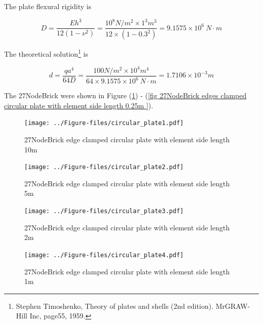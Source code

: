 \documentclass[fleqn,11pt]{article}
\begin{document}
The plate flexural rigidity is 

\begin{equation}
  D=\frac{Eh^3}{12(1-\nu^2)}=\frac{10^8 N/m^2 \times 1^3 m^3 }{12 \times (1-0.3^2) }= 9.1575 \times 10^6 \ N\cdot m
\end{equation}

The theoretical solution\footnote{Stephen Timoshenko, Theory of plates and shells (2nd edition). MrGRAW-Hill Inc, page55, 1959.} is 

\begin{equation}
  d= \frac{q a^4}{64D}=\frac{100 N/m^2 \times 10^4 m^4}{64 \times 9.1575 \times 10^6 \ N\cdot m}=1.7106\times 10^{-3} m
\end{equation}

The 27NodeBrick were shown in Figure (\ref{fig 27NodeBrick edges clamped circular plate with element side length 10m }) - (\ref{fig 27NodeBrick edges clamped circular plate with element side length 0.25m }). 




\begin{figure}[H]
  \centering
  \texttt{[image: ../Figure-files/circular\_plate1.pdf]}
  \caption{27NodeBrick edge clamped circular plate with element side length 10m }
  \label{fig 27NodeBrick edges clamped circular plate with element side length 10m }
\end{figure}

\newpage

\begin{figure}[H]
  \centering
  \texttt{[image: ../Figure-files/circular\_plate2.pdf]}
  \caption{27NodeBrick edge clamped circular plate with element side length 5m }
  \label{fig 27NodeBrick edges clamped circular plate with element side length 5m }
\end{figure}


\begin{figure}[H]
  \centering
  \texttt{[image: ../Figure-files/circular\_plate3.pdf]}
  \caption{27NodeBrick edge clamped circular plate with element side length 2m }
  \label{fig 27NodeBrick edges clamped circular plate with element side length 2m }
\end{figure}

\newpage

\begin{figure}[H]
  \centering
  \texttt{[image: ../Figure-files/circular\_plate4.pdf]}
  \caption{27NodeBrick edge clamped circular plate with element side length 1m }
  \label{fig 27NodeBrick edges clamped circular plate with element side length 1m }
\end{figure}
\end{document}
